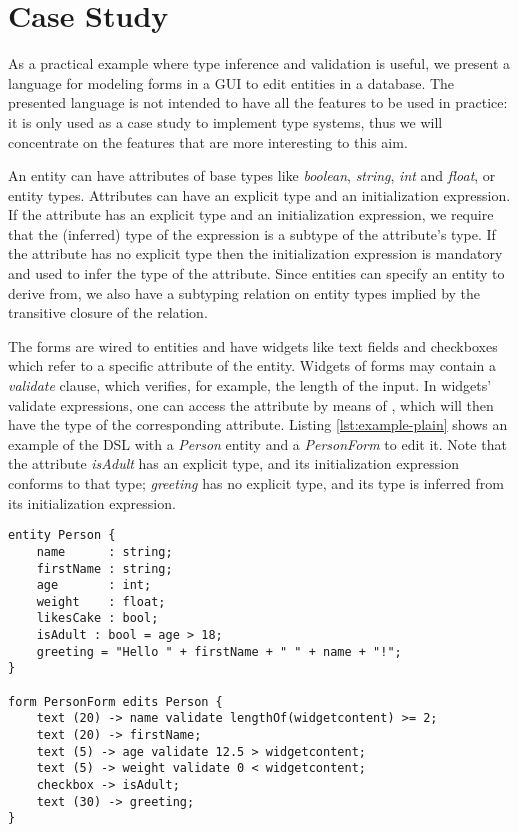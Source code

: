 \section{Case Study}
\label{sec:casestudy}

As a practical example where type inference and validation is useful, we present
a language for modeling forms in a GUI to edit entities in a database.  The
presented language is not intended to have all the features to be used in
practice: it is only used as a case study to implement type systems, thus we
will concentrate on the features that are more interesting to this aim.

An entity can have attributes of base types like \emph{boolean}, \emph{string},
\emph{int} and \emph{float}, or entity types.
Attributes can have an explicit type and an initialization expression.
If the attribute has an explicit type and an initialization expression, we
require that the (inferred) type of the expression is a subtype of the
attribute's type. If the attribute has no explicit type then the initialization
expression is mandatory and used to infer the type of the attribute.
Since entities can specify an entity to derive from, we also have a subtyping
relation on entity types implied by the transitive closure of the
 relation.

The forms are wired to entities and have widgets like text fields and
checkboxes which refer to a specific attribute of the entity.
Widgets of forms may contain a \emph{validate} clause, which verifies, for
example, the length of the input.
In widgets' validate expressions, one can access the attribute by means of
, which will then have the type of the corresponding
attribute.  Listing \ref{lst:example-plain} shows an example of the DSL with a \emph{Person}
entity and a \emph{PersonForm} to edit it. Note that the attribute
\emph{isAdult} has an explicit type, and its initialization expression
conforms to that type; \emph{greeting} has no explicit type, and its type is
inferred from its initialization expression.

%

\begin{lstlisting}[language=guidsl,float,label=lst:example-plain,caption=Forms
and Entities DSL.] 
entity Person {
	name      : string;
	firstName : string;
	age       : int; 
	weight    : float;
	likesCake : bool; 
	isAdult : bool = age > 18;
	greeting = "Hello " + firstName + " " + name + "!";
}

form PersonForm edits Person {
	text (20) -> name validate lengthOf(widgetcontent) >= 2;
	text (20) -> firstName;
	text (5) -> age validate 12.5 > widgetcontent;
	text (5) -> weight validate 0 < widgetcontent;
	checkbox -> isAdult;
	text (30) -> greeting;
}
\end{lstlisting}


